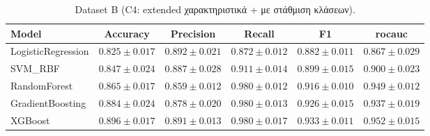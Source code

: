 \begin{table}[H]
    \centering
    \caption{Dataset B (C4: extended χαρακτηριστικά + με στάθμιση κλάσεων).}
    \label{tab:results-c4-dataset-b}
    \scriptsize
    \begin{tabular}{@{}lccccc@{}}
        \toprule
        Model & Accuracy & Precision & Recall & F1 & \gls{rocauc} \\
        \midrule
        LogisticRegression & $0.825 \pm 0.017$ & $0.892 \pm 0.021$ & $0.872 \pm 0.012$ & $0.882 \pm 0.011$ & $0.867 \pm 0.029$ \\
        SVM\_RBF & $0.847 \pm 0.024$ & $0.887 \pm 0.028$ & $0.911 \pm 0.014$ & $0.899 \pm 0.015$ & $0.900 \pm 0.023$ \\
        RandomForest & $0.865 \pm 0.017$ & $0.859 \pm 0.012$ & $0.980 \pm 0.012$ & $0.916 \pm 0.010$ & $0.949 \pm 0.012$ \\
        GradientBoosting & $0.884 \pm 0.024$ & $0.878 \pm 0.020$ & $0.980 \pm 0.013$ & $0.926 \pm 0.015$ & $0.937 \pm 0.019$ \\
        XGBoost & $0.896 \pm 0.017$ & $0.891 \pm 0.013$ & $0.980 \pm 0.017$ & $0.933 \pm 0.011$ & $0.952 \pm 0.015$ \\
        \bottomrule
    \end{tabular}
\end{table}
